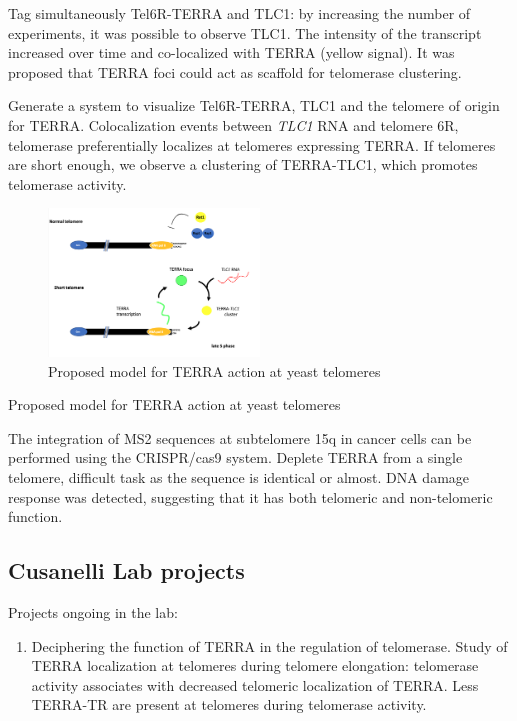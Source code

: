 Tag simultaneously Tel6R-TERRA and TLC1: by increasing the number of
experiments, it was possible to observe TLC1. The intensity of the
transcript increased over time and co-localized with TERRA (yellow
signal). It was proposed that TERRA foci could act as scaffold for
telomerase clustering.

Generate a system to visualize Tel6R-TERRA, TLC1 and the telomere of
origin for TERRA. Colocalization events between \emph{TLC1} RNA and
telomere 6R, telomerase preferentially localizes at telomeres expressing
TERRA.  If telomeres are short enough, we observe a clustering of
TERRA-TLC1, which promotes telomerase activity.

\begin{figure}
\centering
\includegraphics[width=0.5\textwidth]{../_resources/Screen_Shot_2022-12-17_at_11-08-23.png}
\caption{Proposed model for TERRA action at yeast telomeres}
\end{figure}

Proposed model for TERRA action at yeast telomeres

The integration of MS2 sequences at subtelomere 15q in cancer cells can
be performed using the CRISPR/cas9 system. Deplete TERRA from a single
telomere, difficult task as the sequence is identical or almost. DNA
damage response was detected, suggesting that it has both telomeric and
non-telomeric function.

\hypertarget{cusanelli-lab-projects}{%
\subsection{Cusanelli Lab projects}\label{cusanelli-lab-projects}}

Projects ongoing in the lab:

\begin{enumerate}
\def\labelenumi{\arabic{enumi}.}
\tightlist
\item
  Deciphering the function of TERRA in the regulation of telomerase.
  Study of TERRA localization at telomeres during telomere elongation:
  telomerase activity associates with decreased telomeric localization
  of TERRA. Less TERRA-TR are present at telomeres during telomerase
  activity.
\end{enumerate}

